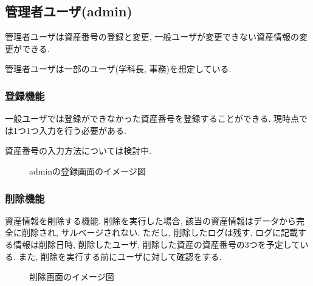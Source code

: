 \documentclass[11ptm]{jsarticle}
\begin{document}
\clearpage
\subsection{管理者ユーザ(admin)}
\label{subsec:管理者ユーザ(admin)}
管理者ユーザは資産番号の登録と変更, 一般ユーザが変更できない資産情報の変更ができる. \par
管理者ユーザは一部のユーザ(学科長, 事務)を想定している. 

\subsubsection{登録機能}
\label{subsubsec:登録機能(admin)}
一般ユーザでは登録ができなかった資産番号を登録することができる. 現時点では1つ1つ入力を行う必要がある. \par
資産番号の入力方法については検討中. 
\begin{figure}[h]
  \centering
  \caption{\label{fig:adminの登録画面のイメージ図}adminの登録画面のイメージ図}
\end{figure}\par

\clearpage
\subsubsection{削除機能}
\label{subsubsec:削除機能}
資産情報を削除する機能. 削除を実行した場合, 該当の資産情報はデータから完全に削除され, サルベージされない. ただし, 削除したログは残す. ログに記載する情報は削除日時, 削除したユーザ, 削除した資産の資産番号の3つを予定している. また, 削除を実行する前にユーザに対して確認をする.
\begin{figure}[h]
  \centering
  \caption{\label{fig:削除画面のイメージ図}削除画面のイメージ図}
\end{figure}\par
\end{document}
